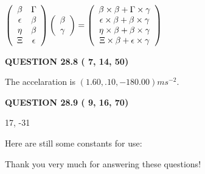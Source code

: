 \documentclass[12pt]{article}
\begin{document}
$  %
 \left( \begin{array}
 {
 c
 c
 }
 \beta & 
 \Gamma \\ 
 \epsilon & 
 \beta \\ 
 \eta & 
 \beta \\ 
                    \Xi & 
 \epsilon
 \end{array} \right)
 \left( \begin{array}
 {
 c
 }
 \beta \\ 
 \gamma
 \end{array} \right)
=
  \left( \begin{array}
 {
 c
 }
 \beta \times  \beta   +  \Gamma \times  \gamma \\ 
 \epsilon \times  \beta   +  \beta \times  \gamma \\ 
 \eta \times  \beta   +  \beta \times  \gamma \\ 
                    \Xi \times  \beta   +  \epsilon \times  \gamma
 \end{array} \right)
$
 
 
 
  
\vspace{0.2in}
  
{\textbf{\Large{QUESTION
28.8 
 (          7,         14,         50)
}}}
  
  
 
 
\noindent{}
 
 
  The accelaration is $  %
(
1.60,
.10,
-180.00)
ms^{-2} $.
 
 
 
 
  
\vspace{0.2in}
  
{\textbf{\Large{QUESTION
28.9 
 (          9,         16,         70)
}}}
  
  


 
 
\noindent{}

17,  %
-31
 
 
 
   
   
 \vspace{0.2in}
Here are still some constants for use:
 
 
 
 
Thank you very much for answering these questions!
 
\end{document}
